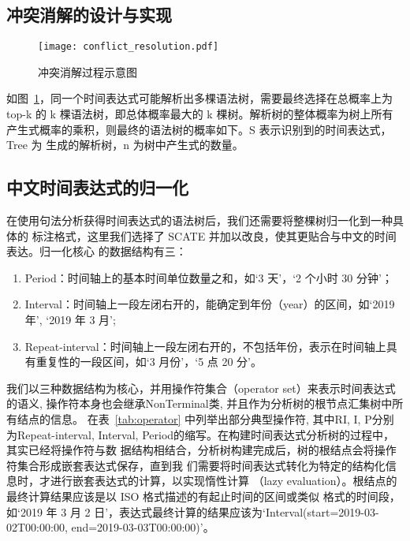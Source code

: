 \subsection{冲突消解的设计与实现}


\begin{figure}[h]
    \centering
    \texttt{[image: conflict\_resolution.pdf]}
    \caption{冲突消解过程示意图}
    \label{fig:conflict_resolution}
\end{figure}

如图~\ref{fig:conflict_resolution}，同一个时间表达式可能解析出多棵语法树，需要最终选择在总概率上为 top-k 的
k 棵语法树，即总体概率最大的 k 棵树。解析树的整体概率为树上所有产生式概率的乘积，则最终的语法树的概率如下。S 表示识别到的时间表达式，Tree 为
生成的解析树，n 为树中产生式的数量。




\subsection{中文时间表达式的归一化}

在使用句法分析获得时间表达式的语法树后，我们还需要将整棵树归一化到一种具体的
标注格式，这里我们选择了 SCATE 并加以改良，使其更贴合与中文的时间表达。归一化核心
的数据结构有三：
\begin{enumerate}
    \item Period：时间轴上的基本时间单位数量之和，如‘3 天’，‘2 个小时 30 分钟’；
    \item Interval：时间轴上一段左闭右开的，能确定到年份（year）的区间，如‘2019 年’, ‘2019 年 3 月’;
    \item Repeat-interval：时间轴上一段左闭右开的，不包括年份，表示在时间轴上具有重复性的一段区间，如‘3 月份’，‘5 点 20 分’。
\end{enumerate}

我们以三种数据结构为核心，并用操作符集合（operator set）来表示时间表达式的语义, 操作符本身也会继承NonTerminal类, 并且作为分析树的根节点汇集树中所有结点的信息。
在表~\ref{tab:operator} 中列举出部分典型操作符, 其中RI, I, P分别为Repeat-interval, Interval, Period的缩写。在构建时间表达式分析树的过程中，其实已经将操作符与数
据结构相结合，分析树构建完成后，树的根结点会将操作符集合形成嵌套表达式保存，直到我
们需要将时间表达式转化为特定的结构化信息时，才进行嵌套表达式的计算，以实现惰性计算
（lazy evaluation）。根结点的最终计算结果应该是以 ISO 格式描述的有起止时间的区间或类似
格式的时间段，如‘2019 年 3 月 2 日’，表达式最终计算的结果应该为‘Interval(start=2019-03-
02T00:00:00, end=2019-03-03T00:00:00)’。


